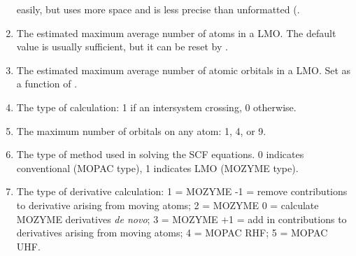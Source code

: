 \begin{enumerate}
easily, but uses more space and is less precise than unformatted (.
\addtocounter{enumi}{2}
\item {} The estimated maximum average number of atoms in a LMO.
The default value is usually sufficient, but it can be reset by .
\item {} The estimated maximum average number of atomic orbitals
in a LMO.  Set as a function of .
\addtocounter{enumi}{34}
\item {} The type of calculation: 1 if an intersystem crossing,
0 otherwise.
\item {} The maximum number of orbitals on any atom: 1, 4, or 9.
\item {} The type of method used in solving the SCF equations.
0 indicates conventional (MOPAC type), 1 indicates LMO (MOZYME type).
\addtocounter{enumi}{1}
\item {} The type of derivative calculation: 1 = MOZYME -1 =
remove contributions to derivative arising from moving atoms; 2 = MOZYME 0 =
calculate MOZYME derivatives {\em de novo}; 3 = MOZYME +1 = add in contributions
to derivatives arising from moving atoms; 4 = MOPAC RHF; 5 = MOPAC UHF.
\end{enumerate}
